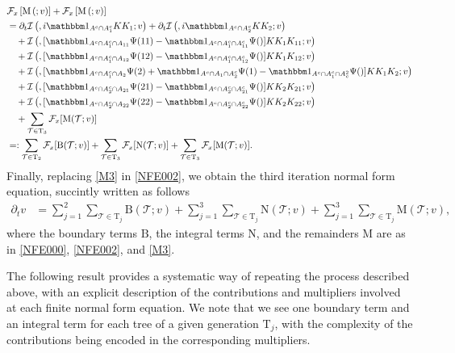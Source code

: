\documentclass[a4paper,
11pt,  reqno]{amsart}
\makeatletter
\newcommand{\5}{\textup{V}}
\newcommand{\ind}{\mathbbm 1}
\newcommand{\dt}{\partial_t}
\theoremstyle{remark}
\newcommand{\TT}{\mathcal{T}}
\newcommand{\Tr}{\mathrm{T}}
\newcommand{\Ft}{{\mathcal{F}}}
\def\<#1>{\csname MH@symb@#1\endcsname}
\newcommand{\Ical}{\mathcal{I}}
\numberwithin{equation}{section}
\numberwithin{theorem}{section}
\newcommand{\MM}{\mathrm{M}}
\newcommand{\NN}{\mathrm{N}}
\newcommand{\BB}{\mathrm{B}}
\makeatother
\begin{document}
\begin{align}
&
 \Ft_x\left[ 
\MM\left(\<21>;v\right)
\right] 
+
 \Ft_x\left[ 
\MM\left(\<22>;v\right)
\right] 
\\
&
=
\dt \Ical\left(\<21>, i \ind_{A^c \cap A_1^c} KK_1 ; v\right)
+
\dt\Ical\left(\<22>, i \ind_{A^c \cap A_2^c} KK_2 ; v\right)
\\
&
\quad 
+ \Ical\left( \<31> ,  [\ind_{A^c\cap A_1^c \cap A_{11}} \Psi(11) - \ind_{A^c\cap A_1^c \cap A_{11}^c} \Psi(\<21>) ] KK_1 K_{11}  ; v \right)
\\
&
\quad 
+
 \Ical\left( \<32> , [ \ind_{A^c\cap A_1^c \cap A_{12}} \Psi(12) - \ind_{A^c \cap A_1^c \cap A_{12}^c} \Psi(\<21>)  ]KK_1 K_{12}  ; v \right)
\\
&
\quad 
+ \Ical\left( \<33> ,  [ \ind_{A^c\cap A_1^c \cap A_{2}} \Psi(2)+ \ind_{A^c \cap A_1 \cap A_2^c} \Psi(1)  - \ind_{A^c \cap A_1^c \cap A^2_c} \Psi(\<1>)] KK_1 K_2    ; v \right)
\\
&
\quad 
+ \Ical\left( \<34> , [ \ind_{A^c \cap A_2^c \cap A_{21}} \Psi(21) - \ind_{A^c \cap A_2^c \cap A_{21}^c} \Psi(\<22>) ]K K_2 K_{21}  ; v \right)
\\
&
\quad 
+ \Ical\left( \<35> ,[ \ind_{A^c \cap A_2^c \cap A_{22} } \Psi(22) - \ind_{A^c \cap A_2^c \cap A_{22}^c} \Psi(\<22>) ] K K_2 K_{22}    ; v \right)
\\
&
\quad 
+ \sum_{\TT\in\Tr_3} 
 \Ft_x[ 
\MM(\TT;v)
] 
\\
&
=: 
\sum_{\TT\in \Tr_2}  
\Ft_x[ 
\BB(\TT;v)
] 
 + \sum_{\TT \in \Tr_3} 
 \Ft_x[ 
\NN(\TT;v)
] 
 + \sum_{\TT\in\Tr_3} 
 \Ft_x[ 
\MM(\TT;v)
] 
. 
\label{M3}
\end{align}
Finally, replacing \eqref{M3} in \eqref{NFE002}, we obtain the third iteration normal form equation, succintly written as follows
\begin{align}
\dt v
&
= \sum_{j=1}^2 \sum_{\TT \in \Tr_j} \BB(\TT ; v) 
+ 
\sum_{j=1}^3 \sum_{\TT\in \Tr_j} \NN(\TT; v) 
+
\sum_{j=1}^3 \sum_{\TT\in \Tr_j} \MM(\TT; v), 
\end{align}
where the boundary terms $\BB$, the integral terms $\NN$, and the remainders $\MM$ are as in \eqref{NFE000}, \eqref{NFE002}, and \eqref{M3}. 





The following result provides a systematic way of repeating the process described above, with an explicit description of the contributions and multipliers involved at each finite normal form equation. 
We note that we see one boundary term and an integral term for each tree of a given generation $\Tr_j$, with the complexity of the contributions being encoded in the corresponding multipliers.
\end{document}
